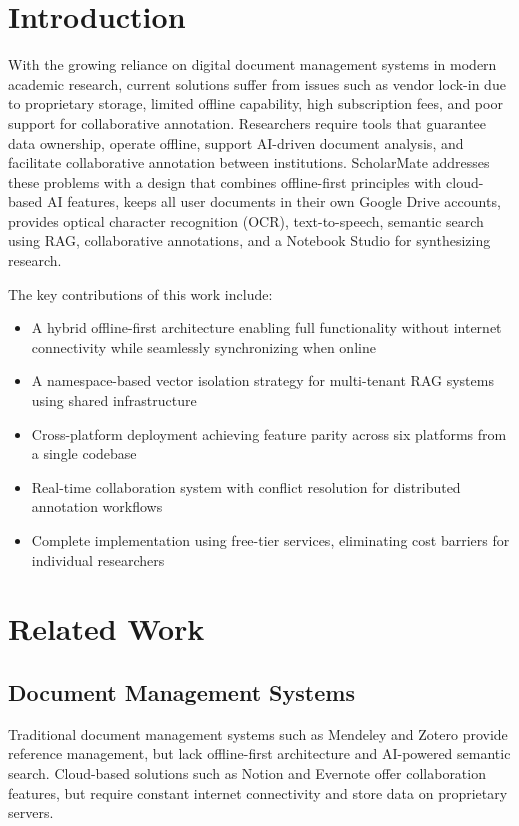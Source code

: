 \documentclass[conference]{IEEEtran}
\begin{document}
\section{Introduction}
With the growing reliance on digital document management systems in modern academic research, current solutions suffer from issues such as vendor lock-in due to proprietary storage, limited offline capability, high subscription fees, and poor support for collaborative annotation. Researchers require tools that guarantee data ownership, operate offline, support AI-driven document analysis, and facilitate collaborative annotation between institutions. ScholarMate addresses these problems with a design that combines offline-first principles with cloud-based AI features, keeps all user documents in their own Google Drive accounts, provides optical character recognition (OCR), text-to-speech, semantic search using RAG, collaborative annotations, and a Notebook Studio for synthesizing research.


The key contributions of this work include:

\begin{itemize}
\item A hybrid offline-first architecture enabling full functionality without internet connectivity while seamlessly synchronizing when online
\item A namespace-based vector isolation strategy for multi-tenant RAG systems using shared infrastructure
\item Cross-platform deployment achieving feature parity across six platforms from a single codebase
\item Real-time collaboration system with conflict resolution for distributed annotation workflows
\item Complete implementation using free-tier services, eliminating cost barriers for individual researchers
\end{itemize}

\section{Related Work}

\subsection{Document Management Systems}

Traditional document management systems such as Mendeley \cite{b1} and Zotero \cite{b2} provide reference management, but lack offline-first architecture and AI-powered semantic search. Cloud-based solutions such as Notion and Evernote offer collaboration features, but require constant internet connectivity and store data on proprietary servers.
\end{document}
